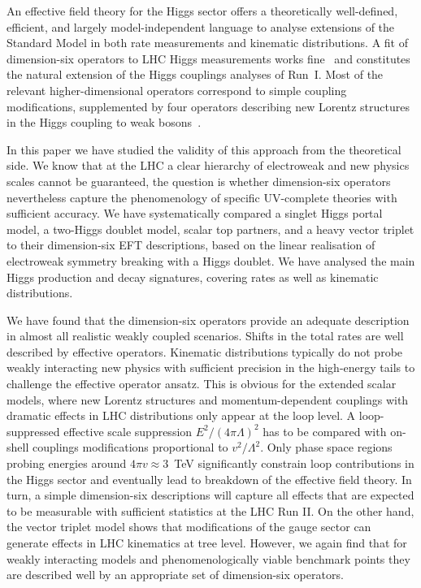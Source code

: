 An effective field theory for the Higgs sector offers a theoretically
well-defined, efficient, and largely model-independent language to
analyse extensions of the Standard Model in both rate measurements and
kinematic distributions. A fit of dimension-six operators to LHC Higgs
measurements works fine~\cite{Corbett:2015ksa} and constitutes the
natural extension of the Higgs couplings analyses of Run~I.  Most of
the relevant higher-dimensional operators correspond to simple
coupling modifications, supplemented by four operators describing new
Lorentz structures in the Higgs coupling to weak
bosons~\cite{Corbett:2015ksa}.

In this paper we have studied the validity of this approach from the
theoretical side.  We know that at the LHC a clear hierarchy of
electroweak and new physics scales cannot be guaranteed, the question
is whether dimension-six operators nevertheless capture the
phenomenology of specific UV-complete theories with sufficient
accuracy.  We have systematically compared a singlet Higgs portal
model, a two-Higgs doublet model, scalar top partners, and a heavy
vector triplet to their dimension-six EFT descriptions, based on the
linear realisation of electroweak symmetry breaking with a Higgs
doublet.  We have analysed the main Higgs production and decay
signatures, covering rates as well as kinematic distributions.

We have found that the dimension-six operators provide an adequate
description in almost all realistic weakly coupled scenarios. Shifts
in the total rates are well described by effective operators.
Kinematic distributions typically do not probe weakly interacting new
physics with sufficient precision in the high-energy tails to
challenge the effective operator ansatz.  This is obvious for the
extended scalar models, where new Lorentz structures and
momentum-dependent couplings with dramatic effects in LHC
distributions only appear at the loop level.  A loop-suppressed
effective scale suppression $E^2/(4 \pi \Lambda)^2$ has to be compared
with on-shell couplings modifications proportional to $v^2/\Lambda^2$.
Only phase space regions probing energies around $4 \pi v \approx
3$~TeV significantly constrain loop contributions in the Higgs sector
and eventually lead to breakdown of the effective field theory. In
turn, a simple dimension-six descriptions will capture all effects that
are expected to be measurable with sufficient statistics at the LHC
Run II.  On the other hand, the vector triplet model shows that
modifications of the gauge sector can generate effects in LHC
kinematics at tree level. However, we again find that for weakly
interacting models and phenomenologically viable benchmark points they
are described well by an appropriate set of dimension-six
operators.

